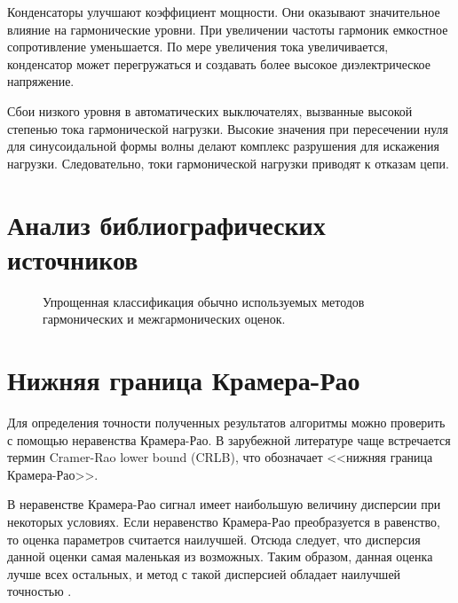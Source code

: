 Конденсаторы улучшают коэффициент мощности. Они оказывают значительное влияние на гармонические уровни. При увеличении частоты гармоник емкостное сопротивление уменьшается. По мере увеличения тока увеличивается, конденсатор может перегружаться и создавать более высокое диэлектрическое напряжение.

Сбои низкого уровня в автоматических выключателях, вызванные высокой степенью тока гармонической нагрузки. Высокие значения при пересечении нуля для синусоидальной формы волны делают комплекс разрушения для искажения нагрузки. Следовательно, токи гармонической нагрузки приводят к отказам цепи.

\section{Анализ библиографических источников } \label{sec:ch1/sec3}



\begin{figure}[ht]
	\caption{Упрощенная классификация обычно используемых методов гармонических и межгармонических оценок.}\label{fig:picture1.3}
\end{figure}
\section{Нижняя граница Крамера-Рао} \label{sec:ch1/sec4}

Для определения точности полученных результатов алгоритмы можно проверить с помощью неравенства Крамера-Рао. В зарубежной литературе чаще встречается термин Cramer-Rao lower bound (CRLB), что обозначает <<нижняя граница Крамера-Рао>>. 

В неравенстве Крамера-Рао сигнал имеет наибольшую величину дисперсии при некоторых условиях. Если неравенство Крамера-Рао преобразуется в равенство, то оценка параметров считается наилучшей. Отсюда следует, что дисперсия данной оценки самая маленькая из возможных. Таким образом, данная оценка лучше всех остальных, и метод с такой дисперсией обладает наилучшей точностью \cite{4515960, 343082, kay1993fundamentals, 1439205, 668800, tran1990cramer}.



